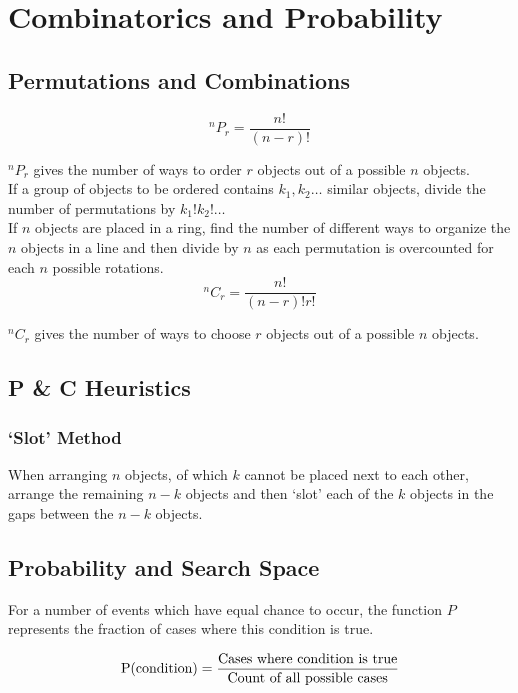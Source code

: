 \documentclass[../main]{subfiles}
\begin{document}
\section{Combinatorics and Probability}

	\subsection{Permutations and Combinations}

	\[ ^nP_r = \frac{n!}{(n-r)!} \]

	\(^nP_r\) gives the number of ways to order \(r\) objects out of a possible \(n\) objects. \\

	If a group of objects to be ordered contains \(k_1, k_2 \dots \) similar objects, divide the number of permutations by \(k_1! k_2! \dots\) \\

	If \(n\) objects are placed in a ring, find the number of different ways to organize the \(n\) objects in a line and then divide by \(n\) as each permutation is overcounted for each \(n\) possible rotations. \\

	\[ ^nC_r = \frac{n!}{(n-r)! r!} \]

	\(^nC_r\) gives the number of ways to choose \(r\) objects out of a possible \(n\) objects.

	\subsection{P \& C Heuristics}

	\subsubsection{`Slot' Method}

	When arranging \(n\) objects, of which \(k\) cannot be placed next to each other, arrange the remaining \(n-k\) objects and then `slot' each of the \(k\) objects in the gaps between the \(n-k\) objects.

	\subsection{Probability and Search Space}

	For a number of events which have equal chance to occur, the function \(P\) represents the fraction of cases where this condition is true.

	\[ \operatorname{P}(\text{condition}) = \frac{\text{Cases where condition is true}}{\text{Count of all possible cases}}\]
\end{document}
